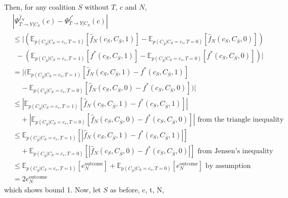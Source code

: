 \documentclass{article}
\theoremstyle{plain}
\theoremstyle{definition}
\theoremstyle{remark}
\newcommand{\effect}{\Psi}
\theoremstyle{mystyle}
\begin{document}
Then, for any coalition $S$ without $T$, $c$ and $N$,
\begin{align*}
&| \effect^{\hat{f}_N}_{ T \rightarrow Y | C_S}(c) - \effect^{f^*}_{ T \rightarrow Y | C_S}(c)| \\
&\leq |(\mathbb{E}_{p(C_{\bar{S}}|C_S=c_s,T=1)}[\hat{f}_N(c_S,C_{\bar{S}},1)] - \mathbb{E}_{p(C_{\bar{S}}|C_S=c_s,T=0)}[\hat{f}_N(c_S,C_{\bar{S}},0)]) \\
& \ \ - (\mathbb{E}_{p(C_{\bar{S}}|C_S=c_s,T=1)}[f^*(c_S,C_{\bar{S}},1)] - \mathbb{E}_{p(C_{\bar{S}}|C_S=c_s,T=0)}[f^*(c_S,C_{\bar{S}},0)])| \\
&= |(\mathbb{E}_{p(C_{\bar{S}}|C_S=c_s,T=1)}[\hat{f}_N(c_S,C_{\bar{S}},1) - f^*(c_S,C_{\bar{S}},1)] \\
& \ \ \ \ \  - \mathbb{E}_{p(C_{\bar{S}}|C_S=c_s,T=0)}[\hat{f}_N(c_S,C_{\bar{S}},0) - f^*(c_S,C_{\bar{S}},0)])| \\
&\leq |\mathbb{E}_{p(C_{\bar{S}}|C_S=c_s,T=1)}[\hat{f}_N(c_S,C_{\bar{S}},1) - f^*(c_S,C_{\bar{S}},1)]|  \\
& \ \ \ \ \  + |\mathbb{E}_{p(C_{\bar{S}}|C_S=c_s,T=0)}[\hat{f}_N(c_S,C_{\bar{S}},0) - f^*(c_S,C_{\bar{S}},0)]| \text{ from the triangle inequality} \\
&\leq \mathbb{E}_{p(C_{\bar{S}}|C_S=c_s,T=1)}[|\hat{f}_N(c_S,C_{\bar{S}},1) - f^*(c_S,C_{\bar{S}},1)|]  \\
& \ \ \ \ \  + \mathbb{E}_{p(C_{\bar{S}}|C_S=c_s,T=0)}[|\hat{f}_N(c_S,C_{\bar{S}},0) - f^*(c_S,C_{\bar{S}},0)|] \text{ from Jensen's inequality} \\
&\leq \mathbb{E}_{p(C_{\bar{S}}|C_S=c_s,T=1)}[e^\text{outcome}_N] + \mathbb{E}_{p(C_{\bar{S}}|C_S=c_s,T=0)}[e^\text{outcome}_N] \text{ by assumption} \\
&= 2e^\text{outcome}_N
\end{align*}
which shows bound 1. Now, let $S$ as before, c, t, N,
\end{document}
